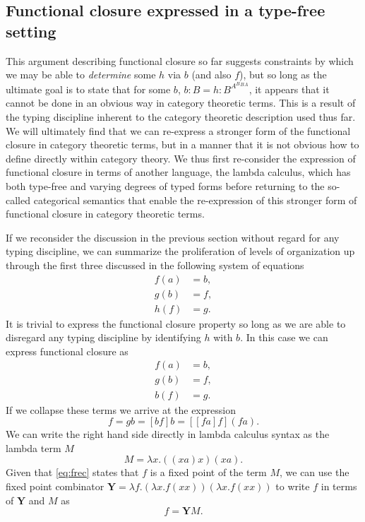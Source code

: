 \subsection*{Functional closure expressed in a type-free setting}
This argument describing functional closure so far suggests constraints by which we may be able to \emph{determine} some $h$ via $b$ (and also $f$), but so long as the ultimate goal is to state that for some $b$, $b:B = h:B^{A^B{^B{^A}}}$, it appears that it cannot be done in an obvious way in category theoretic terms. This is a result of the typing discipline inherent to the category theoretic description used thus far. We will ultimately find that we can re-express a stronger form of the functional closure in category theoretic terms, but in a manner that it is not obvious how to define directly within category theory. We thus first re-consider the expression of functional closure in terms of another language, the lambda calculus, which has both type-free and varying degrees of typed forms \cite{Barendregt1985} before returning to the so-called categorical semantics that enable the re-expression of this stronger form of functional closure in category theoretic terms.

If we reconsider the discussion in the previous section without regard for any typing discipline, we can summarize the proliferation of levels of organization up through the first three discussed in the following system of equations~\cite{Mossio2009}
\begin{align*}
f(a)&=b,\\
g(b)&=f,\\
h(f)&=g.
\end{align*}
It is trivial to express the functional closure property so long as we are able to disregard any typing discipline by identifying $h$ with $b$. In this case we can express functional closure as
\begin{align*}
f(a)&=b,\\
g(b)&=f,\\
b(f)&=g.
\end{align*}
If we collapse these terms we arrive at the expression
\begin{equation}\label{eq:frec}
f = gb = [bf]b = [[fa]f](fa).
\end{equation}
We can write the right hand side directly in lambda calculus syntax as the lambda term $M$
$$
M = \lambda x.((xa)x)(xa).
$$
Given that \ref{eq:frec} states that $f$ is a fixed point of the term $M$, we can use the fixed point combinator $\mathbf{Y} = \lambda f.(\lambda x. f (x x))(\lambda x. f (x x))$ to write $f$ in terms of $\mathbf{Y}$ and $M$ as
$$
f = \mathbf{Y}M.
$$

